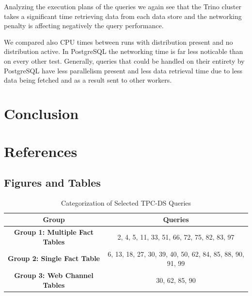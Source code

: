 \documentclass[conference]{IEEEtran}
\begin{document}
Analyzing the execution plans of the queries we again see that the Trino cluster takes a significant time retrieving data from each data store and the networking penalty is affecting negatively the query performance.

We compared also CPU times between runs with distribution present and no distribution active. In PostgreSQL the networking time is far less noticable than on every other test. Generally, queries that could be handled on their entirety by PostgreSQL have less parallelism present and less data retrieval time due to less data being fetched and as a result sent to other workers.

\section{Conclusion}
\section{References}

\subsection{Figures and Tables}
\begin{table}[htbp]
	\caption{Categorization of Selected TPC-DS Queries}
	\begin{center}
		\begin{tabular}{|c|c|}
			\hline
			\textbf{Group}                         & \textbf{Queries}                                          \\
			\hline
			\textbf{Group 1: Multiple Fact Tables} & 2, 4, 5, 11, 33, 51, 66, 72, 75, 82, 83, 97               \\
			\hline
			\textbf{Group 2: Single Fact Table}    & 6, 13, 18, 27, 30, 39, 40, 50, 62, 84, 85, 88, 90, 91, 99 \\
			\hline
			\textbf{Group 3: Web Channel Tables}   & 30, 62, 85, 90                                            \\
			\hline
		\end{tabular}
		\label{table:query-categorization}
	\end{center}
\end{table}
\end{document}
